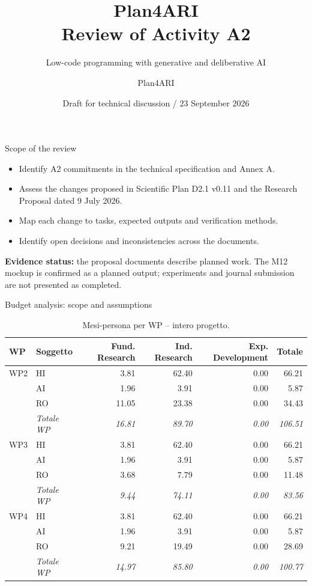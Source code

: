 \documentclass[aspectratio=169,10pt]{beamer}
\title[Plan4ARI / A2 Review]{Plan4ARI\\\large Review of Activity A2}
\subtitle{Low-code programming with generative and deliberative AI}
\author{Plan4ARI}
\institute{Methodological update and technical specification alignment}
\date{Draft for technical discussion / 23 September 2026}
\begin{document}
\begin{frame}
  \titlepage%
\end{frame}

\begin{frame}{Scope of the review}
\begin{itemize}\items%
\item Identify A2 commitments in the technical specification and Annex A.
\item Assess the changes proposed in Scientific Plan D2.1 v0.11 and the Research Proposal dated 9 July 2026.
\item Map each change to tasks, expected outputs and verification methods.
\item Identify open decisions and inconsistencies across the documents.
\end{itemize}
\medskip
\textbf{Evidence status:} the proposal documents describe planned work. The M12 mockup is confirmed as a planned output; experiments and journal submission are not presented as completed.
\end{frame}


\begin{frame}{Budget analysis: scope and assumptions}


\begin{table}[H]\centering\scriptsize\caption{Mesi-persona per WP -- intero progetto.}\label{tab:wp-w-tot}
\begin{tabular}{llrrrr}\toprule\textbf{WP} & \textbf{Soggetto} & \textbf{Fund. Research} & \textbf{Ind. Research} & \textbf{Exp. Development} & \textbf{Totale} \\\midrule
WP2 & HI & 3.81 & 62.40 & 0.00 & 66.21 \\
 & AI & 1.96 & 3.91 & 0.00 & 5.87 \\
 & RO & 11.05 & 23.38 & 0.00 & 34.43 \\
 & \textit{Totale WP} & \textit{16.81} & \textit{89.70} & \textit{0.00} & \textit{106.51} \\\midrule
WP3 & HI & 3.81 & 62.40 & 0.00 & 66.21 \\
 & AI & 1.96 & 3.91 & 0.00 & 5.87 \\
 & RO & 3.68 & 7.79 & 0.00 & 11.48 \\
 & \textit{Totale WP} & \textit{9.44} & \textit{74.11} & \textit{0.00} & \textit{83.56} \\\midrule
WP4 & HI & 3.81 & 62.40 & 0.00 & 66.21 \\
 & AI & 1.96 & 3.91 & 0.00 & 5.87 \\
 & RO & 9.21 & 19.49 & 0.00 & 28.69 \\
 & \textit{Totale WP} & \textit{14.97} & \textit{85.80} & \textit{0.00} & \textit{100.77} \\
\bottomrule\end{tabular}
\end{table}

\end{frame}
\end{document}
